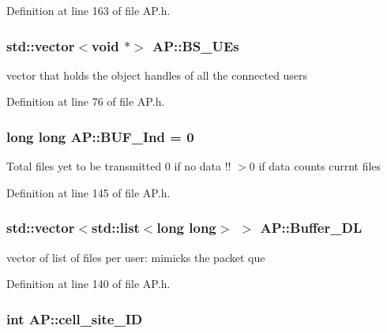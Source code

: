 Definition at line 163 of file A\-P.\-h.

\hypertarget{classAP_ab4709e5956576b8131ae0c63af5c1151}{
\subsubsection[{B\-S\-\_\-\-U\-Es}]{\setlength{\rightskip}{0pt plus 5cm}std\-::vector$<$void $\ast$$>$ A\-P\-::\-B\-S\-\_\-\-U\-Es\hspace{0.3cm}{\ttfamily [private]}}}\label{classAP_ab4709e5956576b8131ae0c63af5c1151}


vector that holds the object handles of all the connected users 



Definition at line 76 of file A\-P.\-h.

\hypertarget{classAP_a6a9694207e9646b4a1c95b54725fcd3b}{
\subsubsection[{B\-U\-F\-\_\-\-Ind}]{\setlength{\rightskip}{0pt plus 5cm}long long A\-P\-::\-B\-U\-F\-\_\-\-Ind = 0}}\label{classAP_a6a9694207e9646b4a1c95b54725fcd3b}
Total files yet to be transmitted 0 if no data !! $>$0 if data counts currnt files 

Definition at line 145 of file A\-P.\-h.

\hypertarget{classAP_af5970c0fdff7405ec2043c7fdd8cb427}{
\subsubsection[{Buffer\-\_\-\-D\-L}]{\setlength{\rightskip}{0pt plus 5cm}std\-::vector$<$std\-::list$<$long long$>$ $>$ A\-P\-::\-Buffer\-\_\-\-D\-L}}\label{classAP_af5970c0fdff7405ec2043c7fdd8cb427}


vector of list of files per user\-: mimicks the packet que 



Definition at line 140 of file A\-P.\-h.

\hypertarget{classAP_a5304bf9c1816c99a39aa31fa220b54d3}{
\subsubsection[{cell\-\_\-site\-\_\-\-I\-D}]{\setlength{\rightskip}{0pt plus 5cm}int A\-P\-::cell\-\_\-site\-\_\-\-I\-D}}\label{classAP_a5304bf9c1816c99a39aa31fa220b54d3}


